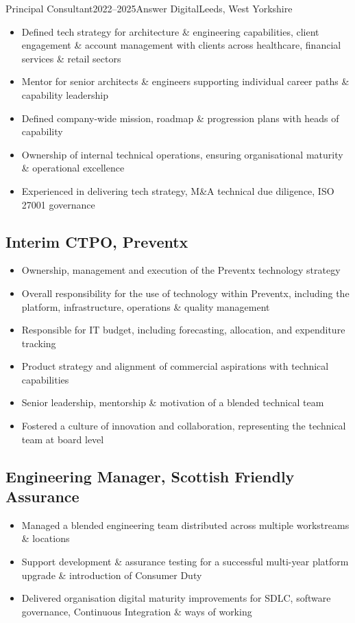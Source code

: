 \documentclass{cv}
\begin{document}
\begin{experienceplain}{Principal Consultant}{2022--2025}{Answer Digital}{Leeds, West Yorkshire}
\begin{itemize}
\item Defined tech strategy for architecture \& engineering capabilities, client engagement \&
      account management with clients across healthcare, financial services \& retail sectors
\item Mentor for senior architects \& engineers supporting individual career paths \& capability leadership
\item Defined company-wide mission, roadmap \& progression plans with heads of capability
\item Ownership of internal technical operations, ensuring organisational maturity \& operational excellence
\item Experienced in delivering tech strategy, M\&A technical due diligence, ISO 27001 governance
\end{itemize}

\subsection{Interim CTPO, Preventx}
\begin{itemize}
\item Ownership, management and execution of the Preventx technology strategy
\item Overall responsibility for the use of technology within Preventx, including the platform,
      infrastructure, operations \& quality management
\item Responsible for IT budget, including forecasting, allocation, and expenditure tracking
\item Product strategy and alignment of commercial aspirations with technical capabilities
\item Senior leadership, mentorship \& motivation of a blended technical team
\item Fostered a culture of innovation and collaboration, representing the technical team at board level
\end{itemize}

\subsection{Engineering Manager, Scottish Friendly Assurance}
\begin{itemize}
\item Managed a blended engineering team distributed across multiple workstreams \& locations
\item Support development \& assurance testing for a successful multi-year platform upgrade \&
      introduction of Consumer Duty
\item Delivered organisation digital maturity improvements for SDLC, software governance,
      Continuous Integration \& ways of working
\end{itemize}


\end{experienceplain}
\end{document}
